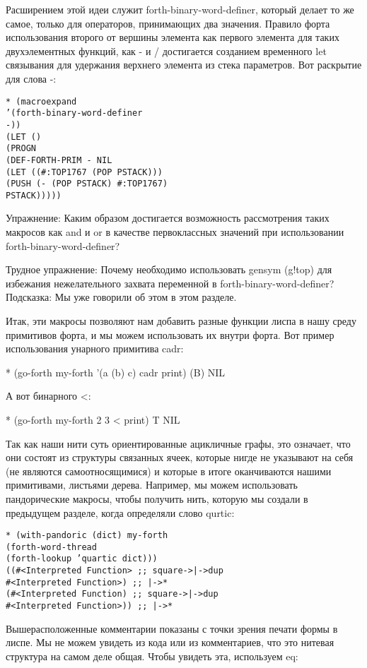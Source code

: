 {{{Расширением этой идеи служит forth-binary-word-definer, который делает то же самое, только для операторов, принимающих два значения. Правило форта использования второго от вершины элемента как первого элемента для таких двухэлементных функций, как - и / достигается созданием временного let связывания для удержания верхнего элемента из стека параметров. Вот раскрытие для слова -:

\begin{verbatim}
* (macroexpand
’(forth-binary-word-definer
-))
(LET ()
(PROGN
(DEF-FORTH-PRIM - NIL
(LET ((#:TOP1767 (POP PSTACK)))
(PUSH (- (POP PSTACK) #:TOP1767)
PSTACK)))))
\end{verbatim}

Упражнение: Каким образом достигается возможность рассмотрения таких макросов как and и or в качестве первоклассных значений при использовании forth-binary-word-definer?

Трудное упражнение: Почему необходимо использовать gensym (g!top) для избежания нежелательного захвата переменной в forth-binary-word-definer? Подсказка: Мы уже говорили об этом в этом разделе.

Итак, эти макросы позволяют нам добавить разные функции лиспа в нашу среду примитивов форта, и мы можем использовать их внутри форта. Вот пример использования унарного примитива cadr:

* (go-forth my-forth
’(a (b) c) cadr print)
(B)
NIL

А вот  бинарного <:

* (go-forth my-forth
2 3 < print)
T
NIL

Так как наши нити суть ориентированные ацикличные графы, это означает, что они состоят из структуры связанных ячеек, которые нигде не указывают на себя (не являются самоотносящимися) и которые в итоге оканчиваются нашими примитивами, листьями дерева. Например, мы можем использовать пандорические макросы, чтобы получить нить, которую мы создали в предыдущем разделе, когда определяли слово qurtic:

\begin{verbatim}
* (with-pandoric (dict) my-forth
(forth-word-thread
(forth-lookup ’quartic dict)))
((#<Interpreted Function> ;; square->|->dup
#<Interpreted Function>) ;; |->*
(#<Interpreted Function) ;; square->|->dup
#<Interpreted Function>)) ;; |->*
\end{verbatim}

Вышерасположенные комментарии показаны с точки зрения печати формы в лиспе. Мы не можем увидеть из кода или из комментариев, что это нитевая структура на самом деле общая. Чтобы увидеть эта, используем eq:

}}}
